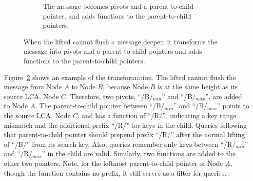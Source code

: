 \begin{figure}
\begin{subfigure}{\textwidth}
        \caption{\label{subfig:spvt-2} The \goto message becomes pivots and a
            parent-to-child pointer, and adds \xf functions to the parent-to-child pointers.}
    \end{subfigure}
    \caption[Transform a \goto message into pivots and a parent-to-child pointer]{\label{fig:spvt}
        When the lifted \bedag cannot flush a \goto message deeper, it
        transforms the \goto message into pivots and a parent-to-child pointers
        and adds \xf functions to the parent-to-child pointers.}
\end{figure}

Figure~\ref{fig:spvt} shows an example of the transformation.
The lifted \bedag cannot flush the \goto message from Node $A$ to Node $B$,
because Node $B$ is at the same height as its source LCA, Node $C$.
Therefore, two pivots, ``/B/$_{min}$'' and ``/B/$_{max}$'', are added to Node $A$.
The parent-to-child pointer between ``/B/$_{min}$'' and ``/B/$_{max}$'' points
to the source LCA, Node $C$, and has a \xf function of ``/R/'', indicating a
key range mismatch and the additional prefix ``/R/'' for keys in the child.
Queries following that parent-to-child pointer should prepend prefix ``/R/''
after the normal lifting of ``/B/'' from its search key.
Also, queries remember only keys between ``/R/$_{min}$'' and ``/R/$_{max}$'' in
the child are valid.
Similarly, two \xf functions are added to the other two pointers.
Note, for the leftmost parent-to-child pointer of Node $A$, though the \xf
function contains no prefix, it still serves as a filter for queries.

